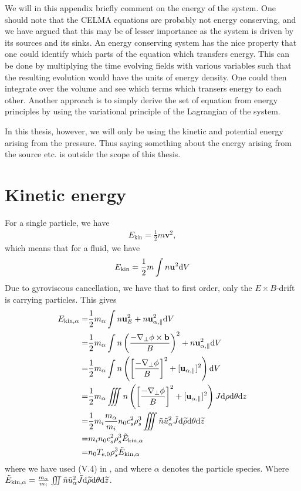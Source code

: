 We will in this appendix briefly comment on the energy of the system.
One should note that the CELMA equations are probably not energy conserving, and we have argued that this may be of lesser importance as the system is driven by its sources and its sinks.
An energy conserving system has the nice property that one could identify which parts of the equation which transfers energy.
This can be done by multiplying the time evolving fields with various variables such that the resulting evolution would have the units of energy density.
One could then integrate over the volume and see which terms which transers energy to each other.
Another approach is to simply derive the set of equation from energy principles by using the variational principle of the Lagrangian of the system.

In this thesis, however, we will only be using the kinetic and potential energy arising from the pressure.
Thus saying something about the energy arising from the source etc. is outside the scope of this thesis.

\section{Kinetic energy}
For a single particle, we have
%
\begin{align*}
E_{\text{kin}} = \frac{1}{2}m\mathbf{v}^2,
\end{align*}
%
which means that for a fluid, we have
%
\begin{align*}
E_{\text{kin}}=\frac{1}{2}m\int n\mathbf{u}^2 \text{d} V
\end{align*}
%
Due to gyroviscous cancellation, we have that to first order, only the $E\times B$-drift is carrying particles.
This gives
%
\begin{align*}
    E_{\text{kin},\alpha}
    =& \frac{1}{2}m_{\alpha}\int
       n\mathbf{u}_E^2
       + n\mathbf{u}_{\alpha,\parallel}^2 \text{d} V
     \\
    =& \frac{1}{2}m_{\alpha}\int
       n\left(\frac{-\nabla_\perp\phi
              \times\mathbf{b}}{B}\right)^2
       + n\mathbf{u}_{\alpha,\parallel}^2 \text{d} V
    \\
    =& \frac{1}{2}m_{\alpha}\int
       n\left(\left[\frac{-\nabla_\perp\phi}{B}\right]^2
       + [\mathbf{u}_{\alpha,\parallel}]^2\right) \text{d} V
   \\
    =& \frac{1}{2}m_{\alpha}\iiint
       n\left(\left[\frac{-\nabla_\perp\phi}{B}\right]^2
       + [\mathbf{u}_{\alpha,\parallel}]^2\right)
       J \text{d}\rho \text{d}\theta \text{d} z
    \\
    =& \frac{1}{2}m_i\frac{m_{\alpha}}{m_i}
       n_0c_s^2\rho_s^3
       \iiint
       \tilde{n}\tilde{u}_\alpha^2
       \tilde{J} \text{d} \widetilde{ \rho} \text{d}\theta \text{d} \widetilde{ z}
    \\
    =& m_in_0c_s^2\rho_s^3 \tilde{E}_{\text{kin},\alpha}
    \\
    =& n_0T_{e,0}\rho_s^3 \tilde{E}_{\text{kin},\alpha}
\end{align*}
%
where we have used (V.4) in \cite{Dhaeseleer1991book}, and where $\alpha$ denotes the particle species.
Where $\tilde{E}_{\text{kin},\alpha} = \frac{m_{\alpha}}{m_i}\iiint \tilde{n}\tilde{u}_\alpha^2 \tilde{J} \text{d} \widetilde{ \rho} \text{d}\theta \text{d} \widetilde{ z}$.

